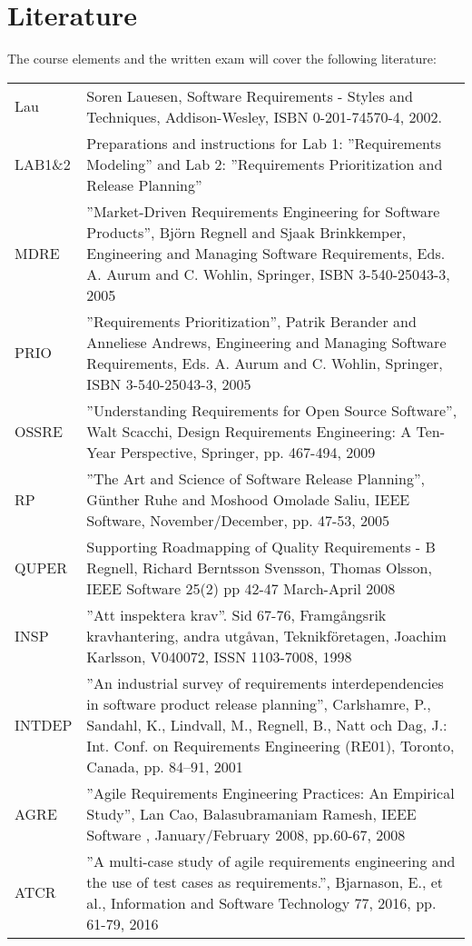 \section{Literature}
The course elements and the written exam will cover the following literature: 
\begin{flushleft}
\setlength{\tabcolsep}{0pt}
\begin{tabular}{p{} p{}}
Lau & Soren Lauesen, Software Requirements - Styles and Techniques, Addison-Wesley, ISBN 0-201-74570-4, 2002. \\
LAB1\&2	&Preparations and instructions for Lab 1: ''Requirements Modeling'' and Lab 2: ''Requirements Prioritization and Release Planning'' \\
MDRE &	''Market-Driven Requirements Engineering for Software Products'', Björn Regnell and Sjaak Brinkkemper, Engineering and Managing Software Requirements, Eds. A. Aurum and C. Wohlin, Springer,  ISBN 3-540-25043-3, 2005 \\
PRIO&	''Requirements Prioritization'', Patrik Berander and Anneliese Andrews, Engineering and Managing Software Requirements, Eds. A. Aurum and C. Wohlin, Springer,  ISBN 3-540-25043-3, 2005 \\
OSSRE & ''Understanding Requirements for Open Source Software'', Walt Scacchi, Design Requirements Engineering: A Ten-Year Perspective, Springer, pp. 467-494, 2009\\
 RP&	''The Art and Science of Software Release Planning'', Günther Ruhe and Moshood Omolade Saliu, IEEE Software, November/December, pp. 47-53, 2005  \\
QUPER&	Supporting Roadmapping of Quality Requirements - B Regnell, Richard Berntsson Svensson, 
Thomas Olsson, IEEE Software 25(2) pp 42-47 March-April 2008  \\
INSP&	''Att inspektera krav''. Sid 67-76, Framgångsrik kravhantering, andra utgåvan, Teknikföretagen, Joachim Karlsson, V040072, ISSN 1103-7008, 1998\\
 INTDEP &	''An industrial survey of requirements interdependencies in software product release planning'', Carlshamre, P., Sandahl, K., Lindvall, M., Regnell, B., Natt och Dag, J.: Int. Conf. on Requirements Engineering (RE01), Toronto, Canada, pp. 84–91, 2001 \\
AGRE &	''Agile Requirements Engineering Practices: An Empirical Study'', Lan Cao, Balasubramaniam Ramesh, IEEE Software , January/February 2008, pp.60-67, 2008 \\
ATCR & ''A multi-case study of agile requirements engineering and the use of test cases as requirements.'', Bjarnason, E., et al., Information and Software Technology 77, 2016, pp. 61-79, 2016 \\
\end{tabular}
\end{flushleft}

